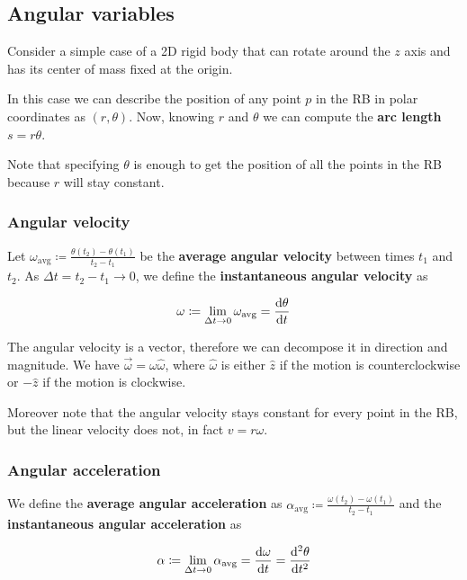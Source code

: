 \documentclass[12pt]{extarticle}
\begin{document}
\subsection{Angular variables}

Consider a simple case of a 2D rigid body that can rotate around the $z$ axis and has its center of mass fixed at the origin.

In this case we can describe the position of any point $p$ in the RB in polar coordinates as $(r, \theta)$. Now, knowing $r$ and $\theta$ we can compute the \textbf{arc length} $s = r\theta$.

Note that specifying $\theta$ is enough to get the position of all the points in the RB because $r$ will stay constant.

\subsubsection{Angular velocity}

Let $\omega_{\text{avg}} \coloneq \frac{\theta(t_2) - \theta(t_1)}{t_2 - t_1}$ be the \textbf{average angular velocity} between times $t_1$ and $t_2$. As $\Delta t = t_2 - t_1 \to 0$, we define the \textbf{instantaneous angular velocity} as

\begin{equation}
    \omega \coloneq \lim_{\Delta t \to 0} \omega_{\text{avg}} = \dv{\theta}{t}
\end{equation}

The angular velocity is a vector, therefore we can decompose it in direction and magnitude. We have $\vec{\omega} = \omega \hat{\omega}$, where $\hat{\omega}$ is either $\hat{z}$ if the motion is counterclockwise or $-\hat{z}$ if the motion is clockwise.

Moreover note that the angular velocity stays constant for every point in the RB, but the linear velocity does not, in fact $v = r\omega$.

\subsubsection{Angular acceleration}

We define the \textbf{average angular acceleration} as $\alpha_{\text{avg}} \coloneq \frac{\omega(t_2) - \omega(t_1)}{t_2 - t_1}$ and the \textbf{instantaneous angular acceleration} as

\begin{equation}
    \alpha \coloneq \lim_{\Delta t \to 0} \alpha_{\text{avg}} = \dv{\omega}{t} = \dv[2]{\theta}{t}
\end{equation}
\end{document}
